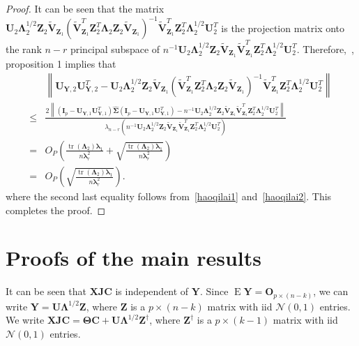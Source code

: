 \documentclass[12pt]{article} %
\DeclareMathOperator{\mytr}{tr}
\DeclareMathOperator{\myE}{E}
\newcommand{\bZ}{\mathbf{Z}}
\newcommand{\bX}{\mathbf{X}}
\newcommand{\bY}{\mathbf{Y}}
\newcommand{\bJ}{\mathbf{J}}
\newcommand{\bC}{\mathbf{C}}
\newcommand{\bO}{\mathbf{O}}
\newcommand{\bI}{\mathbf{I}}
\newcommand{\bU}{\mathbf{U}}
\newcommand{\bV}{\mathbf{V}}
\newcommand{\bfsym}[1]{\ensuremath{\boldsymbol{#1}}}
\def\blambda {\bfsym {\lambda}}
\def\bLambda {\bfsym {\Lambda}}
\def\bSigma {\bfsym {\Sigma}}
\def\bTheta {\bfsym {\Theta}}
\theoremstyle{definition}
\begin{document}
\begin{appendices}
\begin{proof}
    It can be seen that the matrix $
            \bU_2 \bLambda_2^{1/2}\bZ_{2} \tilde{\bV}_{\bZ_1}
            \left(\tilde{\bV}_{\bZ_1}^T \bZ_2^T \bLambda_2 \bZ_2 \tilde{\bV}_{\bZ_1}\right)^{-1}
            \tilde{\bV}_{\bZ_1}^T \bZ_2^T \bLambda_2^{1/2} \bU_2^T
            $ is the projection matrix onto the rank $n-r$ principal subspace of $n^{-1}\bU_2 \bLambda_2^{1/2} \bZ_2 \tilde{\bV}_{\bZ_1}\tilde{\bV}_{\bZ_1}^T  \bZ_2^T \bLambda_2^{1/2} \bU_2^T$.
            Therefore,~\cite{Cai2015Optimal}, proposition 1 implies that
    \begin{equation*}
        \begin{split}
            &\left\|\bU_{\bY,2}\bU_{\bY,2}^{T}-
            \bU_2 \bLambda_2^{1/2}\bZ_{2} \tilde{\bV}_{\bZ_1}
            \left(\tilde{\bV}_{\bZ_1}^T \bZ_2^T \bLambda_2 \bZ_2 \tilde{\bV}_{\bZ_1}\right)^{-1}
            \tilde{\bV}_{\bZ_1}^T \bZ_2^T \bLambda_2^{1/2} \bU_2^T
            \right\|
            \\
             \leq&
             \frac{
                 2\left\|(\bI_p -\bU_{\bY,1}\bU_{\bY,1}^T)\hat{\bSigma}(\bI_p -\bU_{\bY,1}\bU_{\bY,1}^T)
             -
         n^{-1}\bU_2 \bLambda_2^{1/2} \bZ_2 \tilde{\bV}_{\bZ_1}\tilde{\bV}_{\bZ_1}^T  \bZ_2^T \bLambda_2^{1/2} \bU_2^T
             \right\|
         }{
        \lambda_{n-r}\left(
            n^{-1}\bU_2 \bLambda_2^{1/2} \bZ_2 \tilde{\bV}_{\bZ_1}\tilde{\bV}_{\bZ_1}^T  \bZ_2^T \bLambda_2^{1/2} \bU_2^T
        \right)
    }
    \\
    = &
    O_P\left(
        \frac{\mytr(\bLambda_2) \blambda_1}{n\blambda_r^2}
        +
        \sqrt{\frac{\mytr(\bLambda_2) \blambda_1}{n\blambda_r^2}}
    \right)
    \\
    = &
    O_P\left(
        \sqrt{\frac{\mytr(\bLambda_2) \blambda_1}{n\blambda_r^2}}
    \right)
    .
        \end{split}
    \end{equation*}
    where the second last equality follows from~\eqref{haoqilai1} and~\eqref{haoqilai2}.
    This completes the proof.


\end{proof}




\section{Proofs of the main results}\label{app2}

It can be seen that $\bX\bJ\bC$ is independent of $\bY$.
Since
$
\myE \bY = \bO_{p\times (n-k)}
$,
we can write
$
\bY = \bU\bLambda^{1/2} \bZ
$,
where $\bZ$ is a $p\times (n-k)$ matrix with iid $\mathcal{N}(0,1)$ entries.
We write
$
\bX\bJ\bC = \bTheta \bC + \bU\bLambda^{1/2} \bZ^{\dagger}
$, 
where $\bZ^{\dagger}$ is a $p\times (k-1)$ matrix with iid $\mathcal{N}(0,1)$ entries.


\end{appendices}
\end{document}
